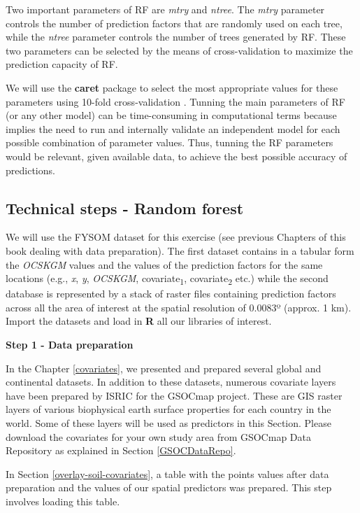 \documentclass[10pt,b5paper,]{book}
\theoremstyle{definition}
\theoremstyle{definition}
\theoremstyle{definition}
\theoremstyle{remark}
\begin{document}
Two important parameters of RF are \emph{mtry} and \emph{ntree}. The
\emph{mtry} parameter controls the number of prediction factors that are
randomly used on each tree, while the \emph{ntree} parameter controls
the number of trees generated by RF. These two parameters can be
selected by the means of cross-validation to maximize the prediction
capacity of RF.

We will use the \textbf{caret} package to select the most appropriate
values for these parameters using 10-fold cross-validation
\citep{kuhn2017caret}. Tunning the main parameters of RF (or any other
model) can be time-consuming in computational terms because implies the
need to run and internally validate an independent model for each
possible combination of parameter values. Thus, tunning the RF
parameters would be relevant, given available data, to achieve the best
possible accuracy of predictions.

\hypertarget{technical-steps---random-forest}{%
\subsection{Technical steps - Random
forest}\label{technical-steps---random-forest}}

We will use the FYSOM dataset for this exercise (see previous Chapters
of this book dealing with data preparation). The first dataset contains
in a tabular form the \emph{OCSKGM} values and the values of the
prediction factors for the same locations (e.g., \emph{x}, \emph{y},
\emph{OCSKGM}, covariate\textsubscript{1}, covariate\textsubscript{2}
etc.) while the second database is represented by a stack of raster
files containing prediction factors across all the area of interest at
the spatial resolution of 0.0083º (approx. 1 km). Import the datasets
and load in \textbf{R} all our libraries of interest.

\textbf{Step 1 - Data preparation}

In the Chapter \ref{covariates}, we presented and prepared several
global and continental datasets. In addition to these datasets, numerous
covariate layers have been prepared by ISRIC for the GSOCmap project.
These are GIS raster layers of various biophysical earth surface
properties for each country in the world. Some of these layers will be
used as predictors in this Section. Please download the covariates for
your own study area from GSOCmap Data Repository as explained in Section
\ref{GSOCDataRepo}.

In Section \ref{overlay-soil-covariates}, a table with the points values
after data preparation and the values of our spatial predictors was
prepared. This step involves loading this table.
\end{document}
